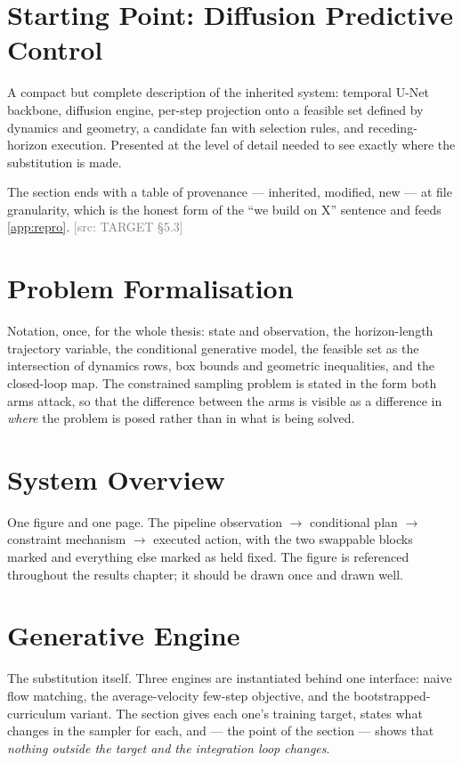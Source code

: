 \documentclass[headsepline,footsepline,footinclude=false,oneside,fontsize=11pt,paper=a4,listof=totoc,bibliography=totoc]{scrbook}
\newcommand{\srcnote}[1]{\textcolor{gray}{\footnotesize\textsf{[src: #1]}}}
\begin{document}
\section{Starting Point: Diffusion Predictive Control}\label{sec:method:dpcc}

A compact but complete description of the inherited system: temporal U-Net backbone,
diffusion engine, per-step projection onto a feasible set defined by dynamics and geometry,
a candidate fan with selection rules, and receding-horizon execution. Presented at the level
of detail needed to see exactly where the substitution is made.

The section ends with a table of provenance --- inherited, modified, new --- at file
granularity, which is the honest form of the ``we build on X'' sentence and feeds
\ref{app:repro}. \srcnote{TARGET \S5.3}

\section{Problem Formalisation}\label{sec:method:formalisation}

Notation, once, for the whole thesis: state and observation, the horizon-length trajectory
variable, the conditional generative model, the feasible set as the intersection of dynamics
rows, box bounds and geometric inequalities, and the closed-loop map. The constrained
sampling problem is stated in the form both arms attack, so that the difference between the
arms is visible as a difference in \emph{where} the problem is posed rather than in what is
being solved.

\section{System Overview}\label{sec:method:overview}

One figure and one page. The pipeline observation $\rightarrow$ conditional plan
$\rightarrow$ constraint mechanism $\rightarrow$ executed action, with the two swappable
blocks marked and everything else marked as held fixed. The figure is referenced throughout
the results chapter; it should be drawn once and drawn well.

\section{Generative Engine}\label{sec:method:engine}

The substitution itself. Three engines are instantiated behind one interface: naive flow
matching, the average-velocity few-step objective, and the bootstrapped-curriculum variant.
The section gives each one's training target, states what changes in the sampler for each,
and --- the point of the section --- shows that \emph{nothing outside the target and the
integration loop changes}.
\end{document}
